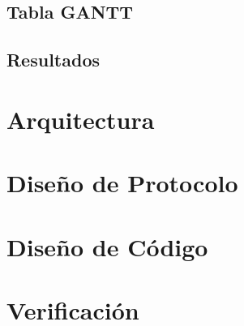 \documentclass[a4paper, 12pt]{article}
\begin{document}
\subsection{Tabla GANTT}
\subsection{Resultados}

\section{Arquitectura}
\section{Diseño de Protocolo}
\section{Diseño de Código}
\section{Verificación}
\end{document}
